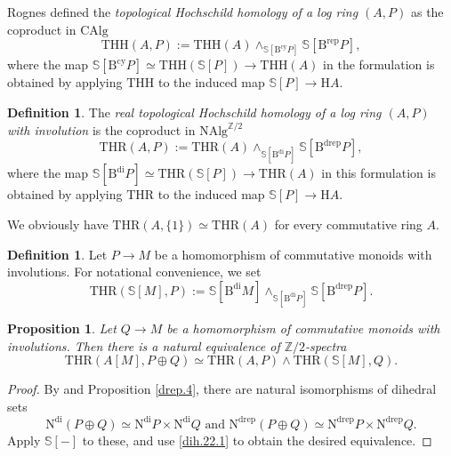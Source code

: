 \documentclass[10pt]{amsart}
\newtheorem{prop}[thm]{Proposition}
\theoremstyle{definition}
\newtheorem{df}[thm]{Definition}
\theoremstyle{remark}
\numberwithin{equation}{section}
\newcommand{\Sphere}{\mathbb{S}}
\newcommand{\CAlg}{\mathrm{CAlg}}
\newcommand{\NAlg}{\mathrm{NAlg}}
\newcommand{\EM}{\mathrm{H}}
\newcommand{\Bcy}{\mathrm{B}^\mathrm{cy}}
\newcommand{\Brep}{\mathrm{B}^\mathrm{rep}}
\newcommand{\Bdi}{\mathrm{B}^{\mathrm{di}}}
\newcommand{\Bdrep}{\mathrm{B}^\mathrm{drep}}
\newcommand{\Ndrep}{\mathrm{N}^\mathrm{drep}}
\newcommand{\Ndi}{\mathrm{N}^\mathrm{di}}
\newcommand{\THH}{\mathrm{THH}}
\newcommand{\THR}{\mathrm{THR}}
\newcommand{\Ztwo}{{\mathbb{Z}/2}}
\begin{document}
Rognes \cite[Definition 8.11, Remark 8.12]{Rog09} 
defined the \emph{topological Hochschild homology of a log ring $(A,P)$} as the coproduct in $\CAlg$
\begin{equation}
\THH(A,P)
:=
\THH(A)\wedge_{\Sphere[\Bcy P]}\Sphere[\Brep P],
\end{equation}
where the map $\Sphere[\Bcy P]\simeq \THH(\Sphere[P])\to \THH(A)$ in the formulation is obtained by applying $\THH$ to the induced map $\Sphere[P]\to \EM A$.








\begin{df}
\label{dih.22}
The \emph{real topological Hochschild homology of a log ring $(A,P)$ with involution} is the coproduct in $\NAlg^{\Ztwo}$
\begin{equation}
\label{dih.22.1}
\THR(A,P)
:=
\THR(A)\wedge_{\Sphere[\Bdi P]}\Sphere[\Bdrep P],
\end{equation}
where the map $\Sphere[\Bdi P]\simeq \THR(\Sphere[P])\to \THR(A)$ in this formulation is obtained by applying $\THR$ to the induced map $\Sphere[P]\to \EM A$.
\end{df}



We obviously have $\THR(A,\{1\})\simeq\THR(A)$ for every commutative ring $A$.



\begin{df}
Let $P\to M$ be a homomorphism of commutative monoids with involutions.
For notational convenience,
we set
\[
\THR(\Sphere[M],P)
:=
\Sphere[\Bdi M]\wedge_{\Sphere[\Bdi P]}\Sphere[\Bdrep P].
\]
\end{df}



\begin{prop}
\label{thrlog.8}
Let $Q\to M$ be a homomorphism of commutative monoids with involutions.
Then there is a natural equivalence of $\Ztwo$-spectra
\[
\THR(A[M],P\oplus Q)
\simeq
\THR(A,P) \wedge \THR(\Sphere[M],Q).
\]
\end{prop}
\begin{proof}
By \cite[Proposition 4.2.4]{THR} and Proposition \ref{drep.4},
there are natural isomorphisms of dihedral sets
\[
\Ndi (P\oplus Q)
\simeq
\Ndi P \times \Ndi Q
\text{ and }
\Ndrep (P\oplus Q)
\simeq
\Ndrep P \times \Ndrep Q.
\]
Apply $\Sphere[-]$ to these,
and use \eqref{dih.22.1} to obtain the desired equivalence.
\end{proof}
\end{document}
